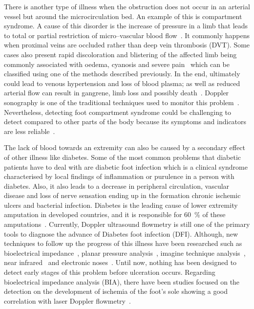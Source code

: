 
There is another type of illness when the obstruction does not occur in an arterial vessel but around the microcirculation bed. An example of this is compartment syndrome. A cause of this disorder is the increase of pressure in a limb that leads to total or partial restriction of micro–vascular blood flow~\cite{songer2001tissue}. It commonly happens when proximal veins are occluded rather than deep vein thrombosis (DVT). Some cases also present rapid discoloration and blistering of the affected limb being commonly associated with oedema, cyanosis and severe pain~\cite{chhabra2013compartment} which can be classified using one of the methods described previously. In the end, ultimately could lead to venous hypertension and loss of blood plasma; as well as reduced arterial flow can result in gangrene, limb loss and possibly death~\cite{lamborn2014compartment}. Doppler sonography is one of the traditional techniques used to monitor this problem~\cite{chhabra2013compartment}. Nevertheless, detecting foot compartment syndrome could be challenging to detect compared to other parts of the body because its symptoms and indicators are less reliable~\cite{dodd2013foot}.  

The lack of blood towards an extremity can also be caused by a secondary effect of other illness like diabetes. Some of the most common problems that diabetic patients have to deal with are diabetic foot infection which is a clinical syndrome characterised by local findings of inflammation or purulence in a person with diabetes. Also, it also leads to a decrease in peripheral circulation, vascular disease and loss of nerve sensation ending up in the formation chronic ischemic ulcers and bacterial infection. Diabetes is the leading cause of lower extremity amputation in developed countries, and it is responsible for \SI{60}{\percent} of these amputations~\cite{ucckay2014diabetic}.  Currently, Doppler ultrasound flowmetry is still one of the primary tools to diagnose the advance of Diabetes foot infection (DFI). Although, new techniques to follow up the progress of this illness have been researched such as bioelectrical impedance~\cite{cheng2012application}, planar pressure analysis~\cite{dos2010insole}, imagine technique analysis~\cite{songer2001tissue}, near infrared~\cite{papazoglou2008assessment} and electronic noses~\cite{yusuf2013diagnosis}. Until now, nothing has been designed to detect early stages of this problem before ulceration occurs. Regarding bioelectrical impedance analysis (BIA), there have been studies focused on the detection on the development of ischemia of the foot's sole showing a good correlation with laser Doppler flowmetry~\cite{cheng2012application}. 

